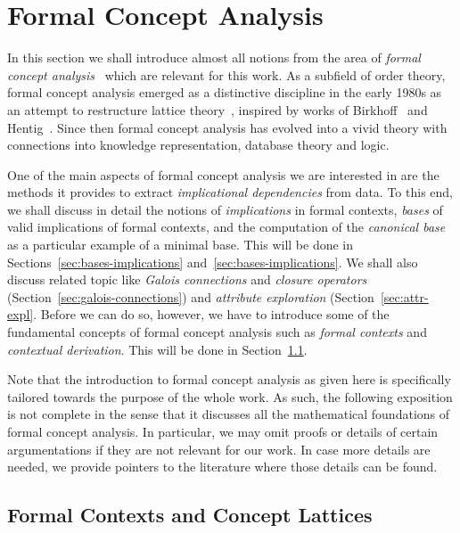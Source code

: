 \chapter{Formal Concept Analysis}
\label{cha:form-conc-analys}

In this section we shall introduce almost all notions from the area of \emph{formal
  concept analysis}~\cite{fca-book} which are relevant for this work.  As a subfield of
order theory, formal concept analysis emerged as a distinctive discipline in the early
1980s as an attempt to restructure lattice theory~\cite{fca:Wille:1982}, inspired by works
of Birkhoff~\cite{books/math/Birkhoff67} and Hentig~\cite{books/phil/Hentig72}.  Since
then formal concept analysis has evolved into a vivid theory with connections into
knowledge representation, database theory and logic.

One of the main aspects of formal concept analysis we are interested in are the methods it
provides to extract \emph{implicational dependencies} from data.  To this end, we shall
discuss in detail the notions of \emph{implications} in formal contexts, \emph{bases} of
valid implications of formal contexts, and the computation of the \emph{canonical base} as
a particular example of a minimal base.  This will be done in
Sections~\ref{sec:bases-implications} and~\ref{sec:bases-implications}.  We shall also
discuss related topic like \emph{Galois connections} and \emph{closure operators}
(Section~\ref{sec:galois-connections}) and \emph{attribute exploration}
(Section~\ref{sec:attr-expl}.  Before we can do so, however, we have to introduce some of
the fundamental concepts of formal concept analysis such as \emph{formal contexts} and
\emph{contextual derivation}.  This will be done in Section~\ref{sec:form-cont-cont}.

Note that the introduction to formal concept analysis as given here is specifically
tailored towards the purpose of the whole work.  As such, the following exposition is not
complete in the sense that it discusses all the mathematical foundations of formal concept
analysis.  In particular, we may omit proofs or details of certain argumentations if they
are not relevant for our work.  In case more details are needed, we provide pointers to
the literature where those details can be found.

\section{Formal Contexts and Concept Lattices}
\label{sec:form-cont-cont}

